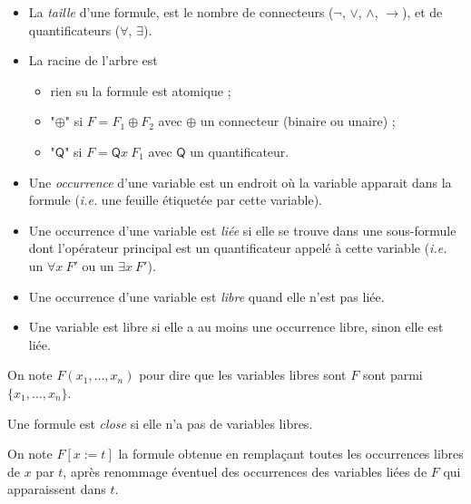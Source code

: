 \documentclass[./main]{subfiles}
\begin{document}
  \begin{defn}
    \begin{itemize}
      \item La \textit{taille} d'une formule, est le nombre de connecteurs ($\lnot$,  $\lor$,  $\land$,  $\to$), et de quantificateurs ($\forall $, $\exists $).
      \item La racine de l'arbre est 
        \begin{itemize}
          \item rien su la formule est atomique ;
          \item "$\oplus$" si $F = F_1 \oplus F_2$ avec $\oplus$ un connecteur (binaire ou unaire) ;
          \item "$\mathsf{Q}$" si $F = \mathsf{Q}x\: F_1$ avec $\mathsf{Q}$ un quantificateur.
        \end{itemize}
    \end{itemize}
  \end{defn}

  \begin{defn}
    \begin{itemize}
      \item Une \textit{occurrence} d'une variable est un endroit où la variable apparait dans la formule (\textit{i.e.} une feuille étiquetée par cette variable).
      \item Une occurrence d'une variable est \textit{liée} si elle se trouve dans une sous-formule dont l'opérateur principal est un quantificateur appelé à cette variable (\textit{i.e.} un $\forall x\: F'$ ou un $\exists x\: F'$).
      \item Une occurrence d'une variable est \textit{libre} quand elle n'est pas liée.
      \item Une variable est libre si elle a au moins une occurrence libre, sinon elle est liée.
    \end{itemize}
  \end{defn}

  \begin{rmk}
    On note $F(x_1, \ldots, x_n)$ pour dire que les variables libres sont $F$ sont parmi $\{x_1, \ldots, x_n\}$.
  \end{rmk}

  \begin{defn}
    Une formule est \textit{close} si elle n'a pas de variables libres.
  \end{defn}

  \begin{defn}[Substitution]
    On note $F[x := t]$ la formule obtenue en remplaçant toutes les occurrences libres de  $x$ par $t$, après renommage éventuel des occurrences des variables liées de $F$ qui apparaissent dans $t$.
  \end{defn}
\end{document}
